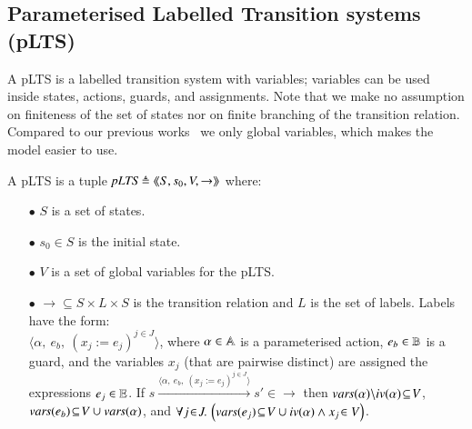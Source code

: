 \documentclass{elsarticle}
\newcommand{\TODO}[1]{\textcolor{red}{\textbf{[TODO:#1]}}}
\newcommand{\LUDO}[1]{\textcolor{darkgreen}{#1}}
\begin{document}

\subsection{Parameterised Labelled Transition systems (pLTS)}
\label{section:plts}

A pLTS is a labelled transition system with variables; variables can be
used inside states, actions, guards, and
assignments. 
Note that we make no assumption on finiteness of the set of states nor
on finite branching of the transition relation. Compared to our previous works~\cite{henrio:Forte2016,AmeurBoulifa2017} we only global variables, which makes the model easier to use.


\begin{definition}[pLTS]
\label{pLTS}
A pLTS is a tuple
$\pLTS\triangleq\mylangle S,s_0, V, \to\myrangle$ where:
\begin{itemize}
\item[$\bullet$]
$S$ is a set of states.
\item[$\bullet$]
$s_0 \in S$ is the initial state.
\item[$\bullet$] $V$ is a set of global variables for the pLTS.
\item[$\bullet$] $\to \subseteq S \times L \times S$ is the transition relation and 
$L$ is the set of labels. Labels have the form:\\
$\langle \alpha,~e_b,~(x_j\!:= {e}_j)^{j\in J}\rangle$,
where $\alpha \in\mathbb{A}$ is a parameterised action, $e_b \in
\mathbb{B}$ is a guard, and the variables $x_j$ (that are pairwise distinct)
are assigned the expressions $e_j\in \mathbb{E}$.
If 
$s \xrightarrow{\langle \alpha,~e_b,~(x_j\!:= {e}_j)^{j\in
		J}\rangle} s'\in \to $ then 
		$\vars(\alpha)\backslash \iv(\alpha)\!\subseteq\! V$, 
		$\vars(e_b)\!\subseteq\! V\cup\vars(\alpha)$, and
		$\forall j\!\in\! J .\,\left(\vars(e_j)\!\subseteq\! V\cup\iv(\alpha)\land 
		x_j\!\in V \right)$. %

\end{itemize}
\end{definition}
\end{document}
